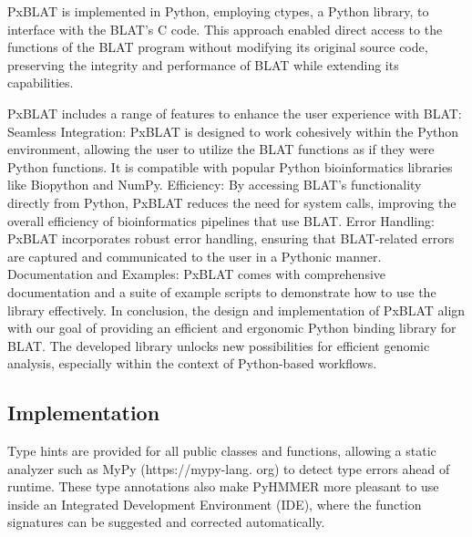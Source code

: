 
PxBLAT is implemented in Python, employing ctypes, a Python library, to interface with the BLAT's C code.
This approach enabled direct access to the functions of the BLAT program without modifying its original source code, preserving the integrity and performance of BLAT while extending its capabilities.



PxBLAT includes a range of features to enhance the user experience with BLAT:
Seamless Integration: PxBLAT is designed to work cohesively within the Python environment, allowing the user to utilize the BLAT functions as if they were Python functions.
It is compatible with popular Python bioinformatics libraries like Biopython and NumPy.
Efficiency: By accessing BLAT's functionality directly from Python, PxBLAT reduces the need for system calls, improving the overall efficiency of bioinformatics pipelines that use BLAT.
Error Handling: PxBLAT incorporates robust error handling, ensuring that BLAT-related errors are captured and communicated to the user in a Pythonic manner.
Documentation and Examples: PxBLAT comes with comprehensive documentation and a suite of example scripts to demonstrate how to use the library effectively.
In conclusion, the design and implementation of PxBLAT align with our goal of providing an efficient and ergonomic Python binding library for BLAT.
The developed library unlocks new possibilities for efficient genomic analysis, especially within the context of Python-based workflows.


\subsection*{Implementation}\label{ssec:implementation}

%

Type hints are provided for all public classes and functions, allowing a static analyzer such as MyPy (https://mypy-lang. org) to detect type errors ahead of runtime.
These type annotations also make PyHMMER more pleasant to use inside an Integrated Development Environment (IDE), where the function signatures can be suggested and corrected automatically.


